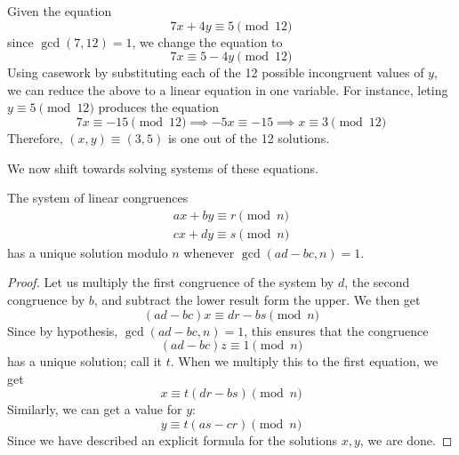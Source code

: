\documentclass{article}
\newcounter{theorem}[section]
\newcounter{example}[section]
\begin{document}
\begin{example}
  \label{ex:solving-a-two-variable-linear-congruence}
Given the equation 
\begin{equation}
  7x + 4y \equiv 5 \pmod{12}
\end{equation}
since $\gcd(7, 12) = 1$, we change the equation to 
\begin{equation}
  7x \equiv 5 - 4y \pmod{12}
\end{equation}
Using casework by substituting each of the 12 possible incongruent values of $y$, we can reduce the above to a linear equation in one variable. For instance, leting $y \equiv 5 \pmod{12}$ produces the equation
\begin{equation}
  7x \equiv -15 \pmod{12} \implies -5x \equiv -15 \implies x \equiv 3 \pmod{12}
\end{equation}
Therefore, $(x, y) \equiv (3, 5)$ is one out of the 12 solutions. 
\end{example}

We now shift towards solving systems of these equations. 

\begin{theorem}
  \label{thm:unique-solution-of-a-congruence-system-in-two}
The system of linear congruences
\begin{align*}
    ax + by \equiv r \pmod{n} \\
    cx + dy \equiv s \pmod{n}
\end{align*}
has a unique solution modulo $n$ whenever $\gcd(ad-bc, n) = 1$. 
\end{theorem}
\begin{proof}
Let us multiply the first congruence of the system by $d$, the second congruence by $b$, and subtract the lower result form the upper. We then get
\begin{equation}
  (ad-bc) x \equiv dr - bs \pmod{n}
\end{equation}
Since by hypothesis, $\gcd(ad-bc, n) = 1$, this ensures that the congruence 
\begin{equation}
  (ad - bc) z \equiv 1 \pmod{n}
\end{equation}
has a unique solution; call it $t$. When we multiply this to the first equation, we get 
\begin{equation}
  x \equiv t (dr - bs) \pmod{n}
\end{equation}
Similarly, we can get a value for $y$:
\begin{equation}
  y \equiv t (as - cr) \pmod{n}
\end{equation}
Since we have described an explicit formula for the solutions $x, y$, we are done. 
\end{proof}
\end{document}
